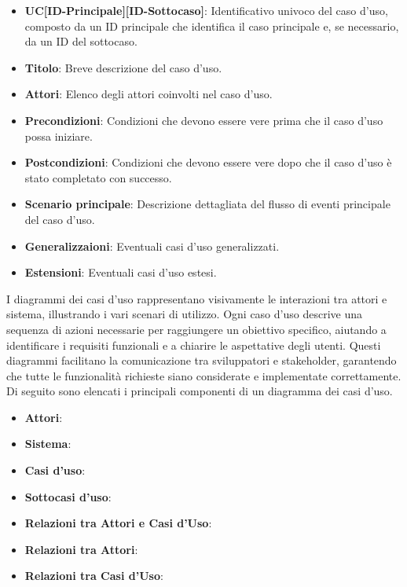 \begin{itemize}
    \item \textbf{UC[ID-Principale][ID-Sottocaso]}: Identificativo univoco del caso d'uso, composto da un ID principale che identifica il caso principale e, se necessario, da un ID del sottocaso.
    \item \textbf{Titolo}: Breve descrizione del caso d'uso.
    \item \textbf{Attori}: Elenco degli attori coinvolti nel caso d'uso.
    \item \textbf{Precondizioni}: Condizioni che devono essere vere prima che il caso d'uso possa iniziare.
    \item \textbf{Postcondizioni}: Condizioni che devono essere vere dopo che il caso d'uso è stato completato con successo.
    \item \textbf{Scenario principale}: Descrizione dettagliata del flusso di eventi principale del caso d'uso.
    \item \textbf{Generalizzaioni}: Eventuali casi d'uso generalizzati.
    \item \textbf{Estensioni}: Eventuali casi d'uso estesi.
\end{itemize}

I diagrammi dei casi d’uso rappresentano visivamente le interazioni tra attori e sistema,
illustrando i vari scenari di utilizzo. Ogni caso d’uso descrive una sequenza di 
azioni necessarie per raggiungere un obiettivo specifico, aiutando a identificare i 
requisiti funzionali e a chiarire le aspettative degli utenti. Questi diagrammi 
facilitano la comunicazione tra sviluppatori e stakeholder, garantendo che tutte le 
funzionalità richieste siano considerate e implementate correttamente. 
Di seguito sono elencati i principali componenti di un diagramma dei casi d’uso.

\begin{itemize}
    \item \textbf{Attori}: 
    \item \textbf{Sistema}: 
    \item \textbf{Casi d’uso}:
    \item \textbf{Sottocasi d’uso}: 
    \item \textbf{Relazioni tra Attori e Casi d’Uso}:
    \item \textbf{Relazioni tra Attori}:
    \item \textbf{Relazioni tra Casi d’Uso}:
\end{itemize}

